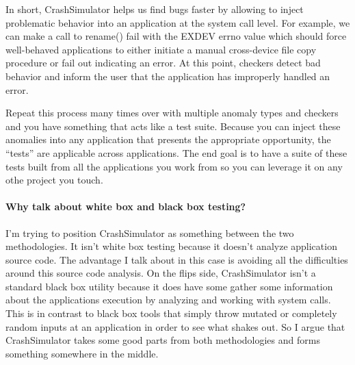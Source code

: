 In short, CrashSimulator helps us find bugs faster by allowing to inject problematic behavior into an application at the
system call level. For example, we can make a call to rename() fail with the EXDEV errno value which should force
well-behaved applications to either initiate a manual cross-device file copy procedure or fail out indicating an
error. At this point, checkers detect bad behavior and inform the user that the application has improperly handled an
error.

Repeat this process many times over with multiple anomaly types and checkers and you have something that acts like a
test suite. Because you can inject these anomalies into any application that presents the appropriate opportunity, the
``tests'' are applicable across applications. The end goal is to have a suite of these tests built from all the
applications you work from so you can leverage it on any othe project you touch.

\paragraph{Why talk about white box and black box testing?}

I'm trying to position CrashSimulator as something between the two methodologies. It isn't white box testing because it
doesn't analyze application source code. The advantage I talk about in this case is avoiding all the difficulties around
this source code analysis. On the flips side, CrashSimulator isn't a standard black box utility because it does have
some gather some information about the applications execution by analyzing and working with system calls. This is in
contrast to black box tools that simply throw mutated or completely random inputs at an application in order to see what
shakes out. So I argue that CrashSimulator takes some good parts from both methodologies and forms something somewhere
in the middle.

